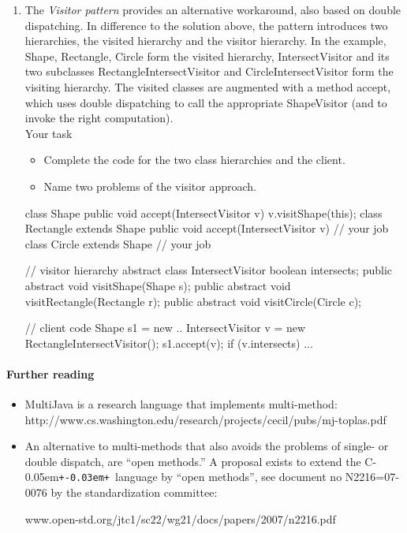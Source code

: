 \documentclass{article}
\newcommand{\Cpp}{C\kern-0.05em\texttt{+\kern-0.03em+}}
\begin{document}
\begin{enumerate}
\item The \textit{Visitor pattern} provides an alternative workaround,
also based on double dispatching. In difference
to the solution above, the pattern 
introduces two hierarchies, the visited
hierarchy and the visitor hierarchy. In the example,
 \textsf{Shape, Rectangle, Circle}
form the visited hierarchy, \textsf{IntersectVisitor} and its two
subclasses \textsf{RectangleIntersectVisitor} and \textsf{CircleIntersectVisitor}
form the visiting hierarchy. The visited classes are
augmented with a method \textsf{accept}, which uses double dispatching
to call the appropriate ShapeVisitor (and to invoke the
right computation). 
\\
Your task
\begin{itemize}
\item Complete the code for the two class hierarchies and the client.
\item Name two problems of the visitor approach.
\end{itemize}

\begin{java2}
class Shape {
    public void accept(IntersectVisitor v) {
	v.visitShape(this);
    }
}
class Rectangle extends Shape {
public  void accept(IntersectVisitor v) { 
        // your job
    }
}
class Circle extends Shape {
   // your job
}
 
// visitor hierarchy
abstract class IntersectVisitor { 
    boolean intersects; 
    public abstract void visitShape(Shape s);
    public abstract void visitRectangle(Rectangle r); 
    public abstract void visitCircle(Circle c); 
} 

// client code
  Shape s1 = new ..
  IntersectVisitor v = new RectangleIntersectVisitor();
  s1.accept(v);
  if (v.intersects) ...
\end{java2}
\end{enumerate}

\paragraph{Further reading}
\begin{itemize}
\item MultiJava is a research language that implements multi-method:\\
\textsf{http://www.cs.washington.edu/research/projects/cecil/pubs/mj-toplas.pdf}
\item An alternative to multi-methods that also avoids the problems of
single- or double dispatch, are ``open methods.'' A
 proposal exists to extend the \Cpp\ language by ``open methods'', see
document no N2216=07-0076 by the standardization committee:

\textsf{www.open-std.org/jtc1/sc22/wg21/docs/papers/2007/n2216.pdf}
\end{itemize}
\end{document}
